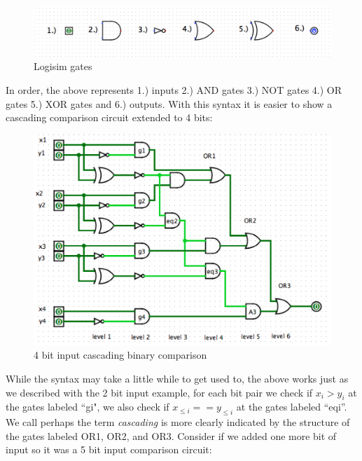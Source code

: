 \documentclass[12pt,twoside]{reedthesis}
\begin{document}
   
   
   
   \begin{figure}[h]
   \centering
   \includegraphics[scale = .35]{logisimgates}
   \caption{Logisim gates}
   \label{subd}
   \end{figure}
   
   \par In order, the above represents 1.) inputs 2.) AND gates 3.) NOT gates 4.) OR gates 5.) XOR gates and 6.) outputs. With this syntax it is easier to show a cascading comparison circuit extended to 4 bits:
   
      \begin{figure}[h]
      \centering
   \includegraphics[scale = .55]{comp2_4}
   \caption{4 bit input cascading binary comparison}
   \label{subd}
   \end{figure}
   
   While the syntax may take a little while to get used to, the above works just as we described with the 2 bit input example, for each bit pair we check if $x_i > y_i$ at the gates labeled ``gi", we also check if $x_{\leq i} == y_{\leq i}$ at the gates labeled ``eqi''. We call perhaps the term \textit{cascading} is more clearly indicated by the structure of the gates labeled OR1, OR2, and OR3. Consider if we added one more bit of input so it was a 5 bit input comparison circuit:
 
\end{document}
